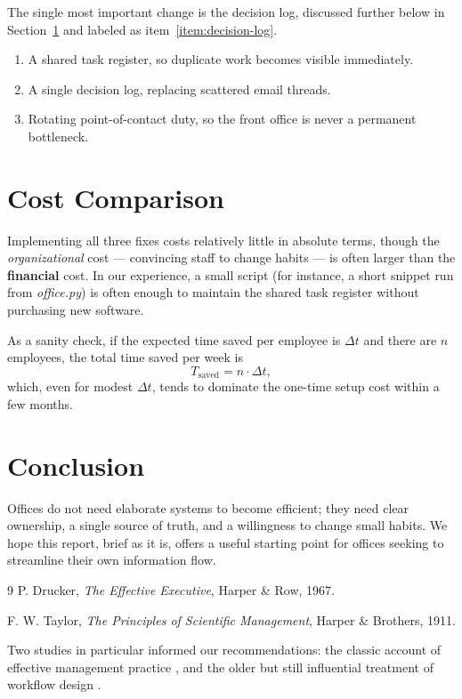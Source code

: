 \documentclass{article}
\begin{document}
The single most important change is the decision log, discussed further below in
Section~\ref{sec:costs} and labeled as item~\ref{item:decision-log}.

\begin{enumerate}
  \item A shared task register, so duplicate work becomes visible immediately.
  \item \label{item:decision-log} A single decision log, replacing scattered email threads.
  \item Rotating point-of-contact duty, so the front office is never a permanent bottleneck.
\end{enumerate}

\section{Cost Comparison}
\label{sec:costs}

Implementing all three fixes costs relatively little in absolute terms, though the
\emph{organizational} cost --- convincing staff to change habits --- is often larger than
the \textbf{financial} cost. In our experience, a small script (for instance, a short
snippet run from \emph{office.py}) is often enough to maintain the shared task register
without purchasing new software.

As a sanity check, if the expected time saved per employee is $\Delta t$ and there are $n$
employees, the total time saved per week is
\[
  T_{\mathrm{saved}} = n \cdot \Delta t,
\]
which, even for modest $\Delta t$, tends to dominate the one-time setup cost within a few
months.

\section{Conclusion}
\label{sec:conclusion}

Offices do not need elaborate systems to become efficient; they need clear ownership, a
single source of truth, and a willingness to change small habits. We hope this report,
brief as it is, offers a useful starting point for offices seeking to streamline their own
information flow.

\begin{thebibliography}{9}
P. Drucker, \emph{The Effective Executive}, Harper \& Row, 1967.

F. W. Taylor, \emph{The Principles of Scientific Management}, Harper \& Brothers, 1911.
\end{thebibliography}

Two studies in particular informed our recommendations: the classic account of effective
management practice \cite{drucker1967}, and the older but still influential treatment of
workflow design \cite{taylor1911}.
\end{document}
